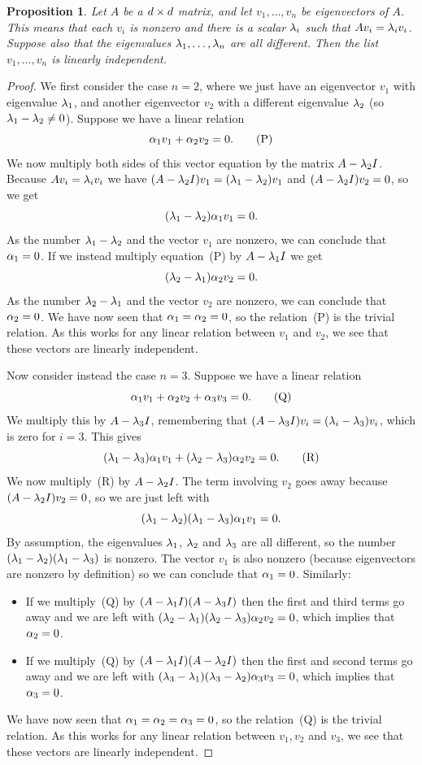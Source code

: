 \documentclass[reqno]{amsart}
\newtheorem{proposition}[theorem]{Proposition}
\theoremstyle{definition}
\begin{document}
\begin{proposition}\label{prop-independent-eigenvectors}
 Let $A$ be a $d\times d$ matrix, and let $v_1,\dotsc,v_n$ be
 eigenvectors of $A$.  This means that each $v_i$ is nonzero and there
 is a scalar $\lambda_i$ such that $Av_i=\lambda_iv_i$.  Suppose also that the
 eigenvalues $\lambda_1,\dotsc,\lambda_n$ are all different.  Then the list
 $v_1,\dotsc,v_n$ is linearly independent.
\end{proposition}
\begin{proof}
 We first consider the case $n=2$, where we just have an eigenvector
 $v_1$ with eigenvalue $\lambda_1$, and another eigenvector $v_2$ with
 a different eigenvalue $\lambda_2$ (so $\lambda_1-\lambda_2\neq 0$).  Suppose we
 have a linear relation
 \[ \alpha_1v_1 + \alpha_2v_2 = 0. \tag{P} \]
 We now multiply both sides of this vector equation by the matrix
 $A-\lambda_2I$.  Because $Av_i=\lambda_iv_i$ we have
 $(A-\lambda_2I)v_1=(\lambda_1-\lambda_2)v_1$ and $(A-\lambda_2I)v_2=0$, so we get
 \[ (\lambda_1-\lambda_2)\alpha_1 v_1 = 0. \]
 As the number $\lambda_1-\lambda_2$ and the vector $v_1$ are nonzero, we can
 conclude that $\alpha_1=0$.  If we instead multiply equation~(P) by
 $A-\lambda_1I$ we get
 \[ (\lambda_2-\lambda_1)\alpha_2v_2 = 0. \]
 As the number $\lambda_2-\lambda_1$ and the vector $v_2$ are nonzero, we can
 conclude that $\alpha_2=0$.  We have now seen that $\alpha_1=\alpha_2=0$, so
 the relation~(P) is the trivial relation.  As this works for any
 linear relation between $v_1$ and $v_2$, we see that these vectors
 are linearly independent.

 Now consider instead the case $n=3$.  Suppose we have a linear
 relation
 \[ \alpha_1v_1 + \alpha_2v_2 + \alpha_3v_3 = 0. \tag{Q} \]
 We multiply this by $A-\lambda_3I$, remembering that
 $(A-\lambda_3I)v_i=(\lambda_i-\lambda_3)v_i$, which is zero for $i=3$.  This
 gives
 \[ (\lambda_1-\lambda_3)\alpha_1v_1 + (\lambda_2-\lambda_3)\alpha_2v_2 = 0. \tag{R} \]
 We now multiply~(R) by $A-\lambda_2I$.  The term involving $v_2$ goes
 away because $(A-\lambda_2I)v_2=0$, so we are just left with
 \[ (\lambda_1-\lambda_2)(\lambda_1-\lambda_3)\alpha_1v_1 = 0. \]
 By assumption, the eigenvalues $\lambda_1$, $\lambda_2$ and $\lambda_3$ are all
 different, so the number $(\lambda_1-\lambda_2)(\lambda_1-\lambda_3)$ is nonzero.
 The vector $v_1$ is also nonzero (because eigenvectors are nonzero by
 definition) so we can conclude that $\alpha_1=0$.  Similarly:
 \begin{itemize}
  \item If we multiply~(Q) by $(A-\lambda_1I)(A-\lambda_3I)$ then the first
   and third terms go away and we are left with
   $(\lambda_2-\lambda_1)(\lambda_2-\lambda_3)\alpha_2v_2=0$, which implies that
   $\alpha_2=0$.
  \item If we multiply~(Q) by $(A-\lambda_1I)(A-\lambda_2I)$ then the first
   and second terms go away and we are left with
   $(\lambda_3-\lambda_1)(\lambda_3-\lambda_2)\alpha_3v_3=0$, which implies that
   $\alpha_3=0$.
 \end{itemize}
 We have now seen that $\alpha_1=\alpha_2=\alpha_3=0$, so
 the relation~(Q) is the trivial relation.  As this works for any
 linear relation between $v_1,v_2$ and $v_3$, we see that these
 vectors are linearly independent.


\end{proof}
\end{document}

